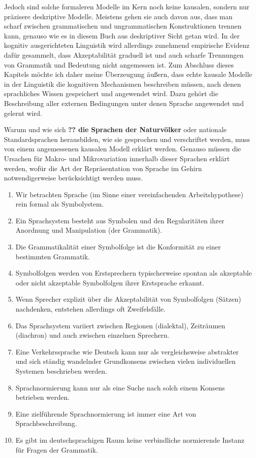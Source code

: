 Jedoch sind solche formaleren Modelle im Kern noch keine kausalen, sondern nur präzisere deskriptive Modelle.
Meistens gehen sie auch davon aus, dass man scharf zwischen grammatischen und ungrammatischen Konstruktionen trennen kann, genauso wie es in diesem Buch aus deskriptiver Sicht getan wird.
In der kognitiv ausgerichteten Linguistik wird allerdings zunehmend empirische Evidenz dafür gesammelt, dass Akzeptabilität graduell ist und auch scharfe Trennungen von Grammatik und Bedeutung nicht angemessen ist.
Zum Abschluss dieses Kapitels möchte ich daher meine Überzeugung äußern, dass echte kausale Modelle in der Linguistik die kognitiven Mechanismen beschreiben müssen, nach denen sprachliches Wissen gespeichert und angewendet wird.
Dazu gehört die Beschreibung aller externen Bedingungen unter denen Sprache angewendet und gelernt wird.

Warum und wie sich \textbf{?? die Sprachen der Naturvölker} oder nationale Standardsprachen herausbilden, wie sie gesprochen und verschriftet werden, muss von einem angemessenen kausalen Modell erklärt werden.
Genauso müssen die Ursachen für Makro- und Mikrovariation innerhalb dieser Sprachen erklärt werden, wofür die Art der Repräsentation von Sprache im Gehirn notwendigerweise berücksichtigt werden muss.


\Zusammenfassung

\begin{enumerate}
  \item Wir betrachten Sprache (im Sinne einer vereinfachenden Arbeitshypothese) rein formal als Symbolystem.
  \item Ein Sprachsystem besteht aus Symbolen und den Regularitäten ihrer Anordnung und Manipulation (der Grammatik).
  \item Die Grammatikalität einer Symbolfolge ist die Konformität zu einer bestimmten Grammatik.
  \item Symbolfolgen werden von Erstsprechern typischerweise spontan als akzeptable oder nicht akzeptable Symbolfolgen ihrer Erstsprache erkannt.
  \item Wenn Sprecher explizit über die Akzeptabilität von Symbolfolgen (\zB Sätzen) nachdenken, entstehen allerdings oft Zweifelsfälle.
  \item Das Sprachsystem variiert zwischen Regionen (dialektal), Zeiträumen (diachron) und auch zwischen einzelnen Sprechern.
  \item Eine Verkehrssprache wie Deutsch kann nur als vergleichsweise abstrakter und sich ständig wandelnder Grundkonsens zwischen vielen individuellen Systemen beschrieben werden.
  \item Sprachnormierung kann nur als eine Suche nach solch einem Konsens betrieben werden.
  \item Eine zielführende Sprachnormierung ist immer eine Art von Sprachbeschreibung.
  \item Es gibt im deutschsprachigen Raum keine verbindliche normierende Instanz für Fragen der Grammatik.
\end{enumerate}
